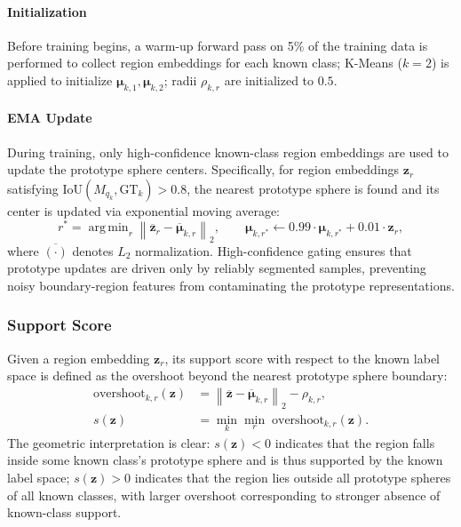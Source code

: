 \documentclass[3p,twocolumn,authoryear]{elsarticle}
\newcommand{\bz}{\mathbf{z}}                              %
\newcommand{\bmu}{\boldsymbol{\mu}}                       %
\DeclareMathOperator*{\argmin}{arg\,min}
\begin{document}
\paragraph{Initialization}
Before training begins, a warm-up forward pass on 5\% of the training data is
performed to collect region embeddings for each known class; K-Means ($k=2$) is
applied to initialize $\bmu_{k,1}, \bmu_{k,2}$; radii $\rho_{k,r}$ are initialized to $0.5$.

\paragraph{EMA Update}
During training, only high-confidence known-class region embeddings are used to
update the prototype sphere centers.
Specifically, for region embeddings $\bz_r$ satisfying
$\text{IoU}(M_{q_k}, \text{GT}_k) > 0.8$, the nearest prototype sphere is found
and its center is updated via exponential moving average:
\begin{equation}\label{eq:ema}
  r^* = \argmin_{r} \left\|\overline{\bz}_r - \overline{\bmu}_{k,r}\right\|_2, \qquad
  \bmu_{k,r^*} \leftarrow 0.99 \cdot \bmu_{k,r^*} + 0.01 \cdot \bz_r,
\end{equation}
where $\overline{(\cdot)}$ denotes $L_2$ normalization.
High-confidence gating ensures that prototype updates are driven only by reliably
segmented samples, preventing noisy boundary-region features from contaminating the
prototype representations.

\subsubsection{Support Score}\label{sec:method:support:score}

Given a region embedding $\bz_r$, its support score with respect to the known label
space is defined as the overshoot beyond the nearest prototype sphere boundary:
\begin{align}
  \text{overshoot}_{k,r}(\bz) &= \left\|\overline{\bz} - \overline{\bmu}_{k,r}\right\|_2 - \rho_{k,r}, \label{eq:overshoot} \\
  s(\bz) &= \min_{k} \min_{r}\; \text{overshoot}_{k,r}(\bz). \label{eq:support_score}
\end{align}
The geometric interpretation is clear:
$s(\bz) < 0$ indicates that the region falls inside some known class's prototype sphere
and is thus supported by the known label space;
$s(\bz) > 0$ indicates that the region lies outside all prototype spheres of all known
classes, with larger overshoot corresponding to stronger absence of known-class support.
\end{document}
